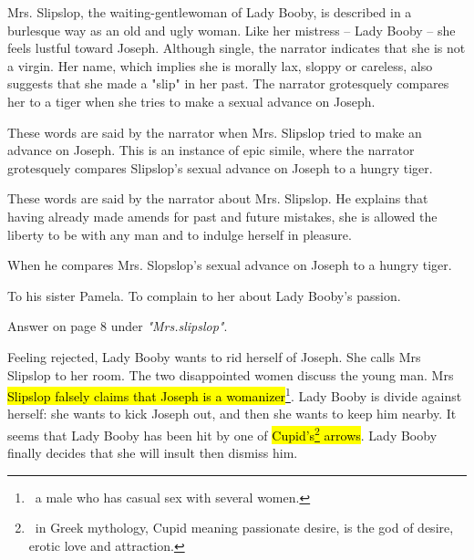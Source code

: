 \documentclass[12pt, a4paper]{article}
\begin{document}

\ind Mrs. Slipslop, the waiting-gentlewoman of Lady Booby, is described in a burlesque way as an old and ugly woman.
Like her mistress -- Lady Booby --
she feels lustful toward Joseph. Although single,
the narrator indicates that she is not a virgin. Her name, which implies she is morally lax, sloppy or careless, also
suggests that she made a "slip" in her past.
The narrator grotesquely compares her to a tiger when she tries to make a sexual advance on Joseph.




These words are said by the narrator when Mrs. Slipslop tried to make an advance on Joseph. This is an instance
of epic simile, where the narrator grotesquely compares Slipslop's sexual advance on Joseph to a hungry tiger.


These words are said by the narrator about Mrs. Slipslop. He explains that 
having already made amends for past and future mistakes, she is allowed the liberty to be with any man
and to indulge herself in pleasure.



When he compares Mrs. Slopslop's sexual advance on Joseph to a hungry tiger.


To his sister Pamela. To complain to her about Lady Booby's passion.


Answer on page 8 under \textit{"Mrs.slipslop"}.


\ind Feeling rejected, Lady Booby wants to rid herself of Joseph. She calls
Mrs Slipslop to her room. The two disappointed women discuss the
young man. Mrs \hl{Slipslop falsely claims that Joseph is a womanizer}\footnote{\,
a male who has casual sex with several women.}. Lady Booby is divide against herself:
she wants to kick Joseph out, and then she wants to keep him nearby. It seems that Lady 
Booby has been hit by one of \hl{Cupid's\footnote{\, in Greek mythology, Cupid meaning passionate desire,
is the god of desire, erotic love and attraction.} arrows}. Lady Booby finally decides 
that she will insult then dismiss him.
\end{document}
